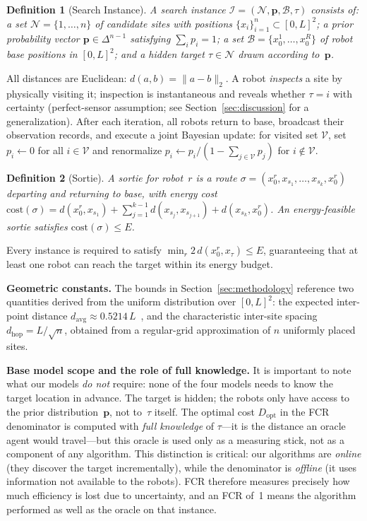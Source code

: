 \documentclass[conference]{IEEEtran}
\newtheorem{definition}{Definition}
\begin{document}
\begin{definition}[Search Instance]
A search instance $\mathcal{I} = (\mathcal{N}, \mathbf{p}, \mathcal{B}, \tau)$
consists of:
a set $\mathcal{N} = \{1,\ldots,n\}$ of candidate sites with positions
$\{x_i\}_{i=1}^n \subset [0,L]^2$;
a prior probability vector $\mathbf{p} \in \Delta^{n-1}$ satisfying
$\sum_i p_i = 1$;
a set $\mathcal{B} = \{x_0^1,\ldots,x_0^R\}$ of robot base positions in
$[0,L]^2$; and a hidden target $\tau \in \mathcal{N}$ drawn according
to~$\mathbf{p}$.
\end{definition}

All distances are Euclidean: $d(a,b) = \|a-b\|_2$.
A robot \emph{inspects} a site by physically visiting it; inspection is
instantaneous and reveals whether $\tau = i$ with certainty (perfect-sensor
assumption; see Section~\ref{sec:discussion} for a generalization).
After each iteration, all robots return to base, broadcast their observation
records, and execute a joint Bayesian update: for visited set $\mathcal{V}$,
set $p_i \leftarrow 0$ for all $i \in \mathcal{V}$ and renormalize
$p_i \leftarrow p_i / (1 - \sum_{j \in \mathcal{V}} p_j)$ for
$i \notin \mathcal{V}$.

\begin{definition}[Sortie]
A \emph{sortie} for robot~$r$ is a route
$\sigma = (x_0^r, x_{s_1}, \ldots, x_{s_k}, x_0^r)$ departing and
returning to base, with energy cost
$\mathrm{cost}(\sigma) = d(x_0^r,x_{s_1}) +
\sum_{j=1}^{k-1} d(x_{s_j},x_{s_{j+1}}) + d(x_{s_k},x_0^r)$.
An energy-feasible sortie satisfies $\mathrm{cost}(\sigma) \leq E$.
\end{definition}

Every instance is required to satisfy
$\min_r 2\,d(x_0^r, x_\tau) \leq E$, guaranteeing that at least one robot
can reach the target within its energy budget.

\textbf{Geometric constants.}
The bounds in Section~\ref{sec:methodology} reference two quantities derived
from the uniform distribution over $[0,L]^2$: the expected inter-point
distance $d_{\mathrm{avg}} \approx 0.5214\,L$~\cite{Robbins1978}, and the
characteristic inter-site spacing $d_{\mathrm{hop}} = L/\sqrt{n}$, obtained
from a regular-grid approximation of $n$ uniformly placed sites.

\textbf{Base model scope and the role of full knowledge.}
It is important to note what our models \emph{do not} require: none of the
four models needs to know the target location in advance.
The target is hidden; the robots only have access to the prior
distribution~$\mathbf{p}$, not to~$\tau$ itself.
The optimal cost $D_{\mathrm{opt}}$ in the FCR denominator is computed with
\emph{full knowledge} of $\tau$---it is the distance an oracle agent would
travel---but this oracle is used only as a measuring stick, not as a
component of any algorithm.
This distinction is critical: our algorithms are \emph{online} (they
discover the target incrementally), while the denominator is \emph{offline}
(it uses information not available to the robots).
FCR therefore measures precisely how much efficiency is lost due to
uncertainty, and an FCR of~1 means the algorithm performed as well as
the oracle on that instance.
\end{document}
